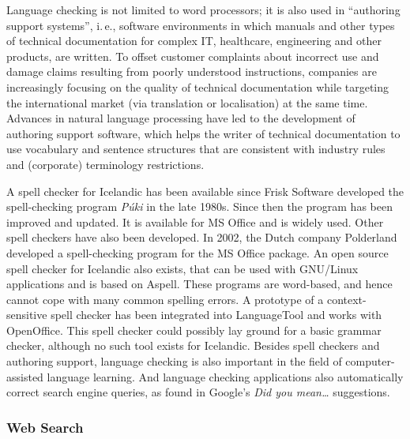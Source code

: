\begin{multicols}{2}
Language checking is not limited to word processors; it is also used in “authoring support systems”, i.\,e., software environments in which manuals and other types of technical documentation for complex IT, healthcare, engineering and other products, are written. To offset customer complaints about incorrect use and damage claims resulting from poorly understood instructions, companies are increasingly focusing on the quality of technical documentation while targeting the international market (via translation or localisation) at the same time. Advances in natural language processing have led to the development of authoring support software, which helps the writer of technical documentation to use vocabulary and sentence structures that are consistent with industry rules and (corporate) terminology restrictions.


A spell checker for Icelandic has been available since Frisk Software developed the spell-checking program \textit{Púki} in the late 1980s. Since then the program has been improved and updated. It is available for MS Office and is widely used. Other spell checkers have also been developed. In 2002, the Dutch company Polderland developed a spell-checking program for the MS Office package. An open source spell checker for Icelandic also exists, that can be used with GNU/Linux applications and is based on Aspell. These programs are word-based, and hence cannot cope with many common spelling errors. A prototype of a context-sensitive spell checker has been integrated into LanguageTool \cite{lto1} and works with OpenOffice. This spell checker could possibly lay ground for a basic grammar checker, although no such tool exists for Icelandic.
Besides spell checkers and authoring support, language checking is also important in the field of computer-assisted language learning. And language checking applications also automatically correct search engine queries, as found in Google's \textit{Did you mean…} suggestions.

\subsubsection{Web Search}


\end{multicols}
